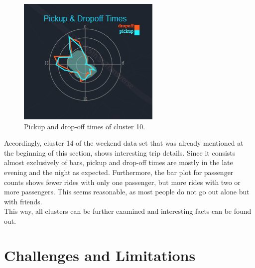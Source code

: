 \documentclass[sigconf, authorversion, nonacm=true]{acmart}
\begin{document}
\begin{figure}[h]
  \centering
  \includegraphics[width=0.4\linewidth]{cluster10_times}
  \caption{Pickup and drop-off times of cluster 10.}
  \label{fig:cluster10_times}
\end{figure}

Accordingly, cluster 14 of the weekend data set that was already mentioned at the beginning of this section, shows interesting trip details. Since it consists almost exclusively of bars, pickup and drop-off times are mostly in the late evening and the night as expected. Furthermore, the bar plot for passenger counts shows fewer rides with only one passenger, but more rides with two or more passengers. This seems reasonable, as most people do not go out alone but with friends.\\
This way, all clusters can be further examined and interesting facts can be found out. 




\section{Challenges and Limitations}
\label{sec:challenges}
\end{document}
